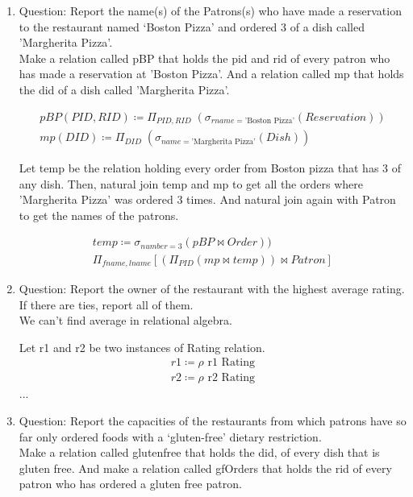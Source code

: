 \documentclass{article}
\begin{document}
\begin{enumerate}
    \item %
         Question: Report the name(s) of the Patrons(s) who have made a reservation to the restaurant
named ‘Boston Pizza’ and ordered 3 of a dish called ’Margherita Pizza’.\\

Make a relation called pBP that holds the pid and rid of every patron who has made a reservation at 'Boston Pizza'. 
And a relation called mp that holds the did of a dish called ’Margherita Pizza’.

\begin{align}
       pBP(PID,RID) \coloneqq \Pi_{PID, RID}\;(\sigma_{rname = \text{'Boston Pizza'}}(Reservation))\\
        mp(DID) \coloneqq \Pi_{DID}\;(\sigma_{name = \text{’Margherita Pizza’}}(Dish))
		\end{align} 
		
		Let temp be the relation holding every order from Boston pizza that has 3 of any dish. Then, natural join temp and mp to get all the orders where ’Margherita Pizza’ was ordered 3 times. And natural join again with Patron to  get the names of the patrons. 
		
\begin{align}
       temp \coloneqq \sigma_{number = 3}(pBP \bowtie Order))\\
       \Pi_{fname, lname}[(\Pi_{PID} (mp \bowtie temp)) \bowtie Patron]
		\end{align} 

\item %
Question: Report the owner of the restaurant with the highest average rating. If there are ties, report all of them.\\

We can't find average in relational algebra.

Let r1 and r2 be two instances of Rating relation.
         \begin{align}
        r1 \coloneqq \rho \text{  r1 Rating}  \\
        r2\coloneqq \rho \text{  r2 Rating}
		\end{align}     
		...

\item %
Question: Report the capacities of the restaurants from which patrons have so far only ordered foods with a
‘gluten-free’ dietary restriction.\\	

Make a relation called glutenfree that holds the did, of every dish that is gluten free. And make a relation called gfOrders that holds the rid of every patron who has ordered a gluten free patron.
		

\end{enumerate}
\end{document}
